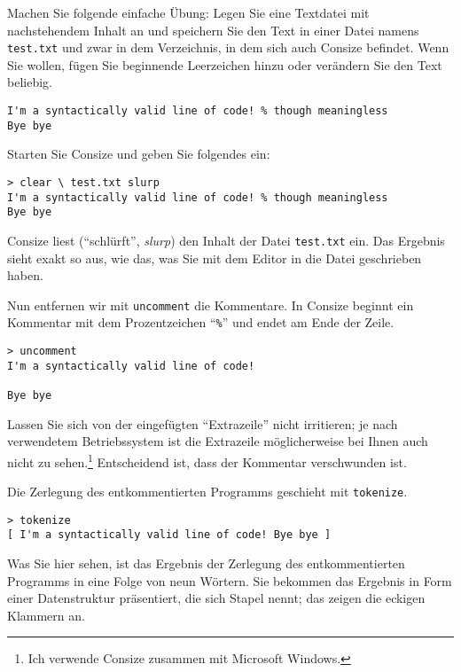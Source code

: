 Machen Sie folgende einfache Übung: Legen Sie eine Textdatei mit nachstehendem Inhalt an und speichern Sie den Text in einer Datei namens \verb|test.txt| und zwar in dem Verzeichnis, in dem sich auch Consize befindet. Wenn Sie wollen, fügen Sie beginnende Leerzeichen hinzu oder verändern Sie den Text beliebig.

\begin{verbatim}
I'm a syntactically valid line of code! % though meaningless
Bye bye
\end{verbatim}

Starten Sie Consize und geben Sie folgendes ein:

\begin{verbatim}
> clear \ test.txt slurp
I'm a syntactically valid line of code! % though meaningless
Bye bye
\end{verbatim}

Consize liest ("`schlürft"', \emph{slurp}) den Inhalt der Datei \verb|test.txt| ein. Das Ergebnis sieht exakt so aus, wie das, was Sie mit dem Editor in die Datei geschrieben haben.

Nun entfernen wir mit \verb|uncomment| die Kommentare. In Consize beginnt ein Kommentar mit dem Prozentzeichen "`\verb|%|"'
und endet am Ende der Zeile.

\begin{verbatim}
> uncomment
I'm a syntactically valid line of code!

Bye bye
\end{verbatim}

Lassen Sie sich von der eingefügten "`Extrazeile"' nicht irritieren; je nach verwendetem Betriebssystem ist die Extrazeile möglicherweise bei Ihnen auch nicht zu sehen.\footnote{Ich verwende Consize zusammen mit Microsoft Windows.} Entscheidend ist, dass der Kommentar verschwunden ist.

Die Zerlegung des entkommentierten Programms geschieht mit \verb|tokenize|.

\begin{verbatim}
> tokenize
[ I'm a syntactically valid line of code! Bye bye ]
\end{verbatim}

Was Sie hier sehen, ist das Ergebnis der Zerlegung des entkommentierten Programms in eine Folge von neun Wörtern. Sie bekommen das Ergebnis in Form einer Datenstruktur präsentiert, die sich Stapel nennt; das zeigen die eckigen Klammern an.

